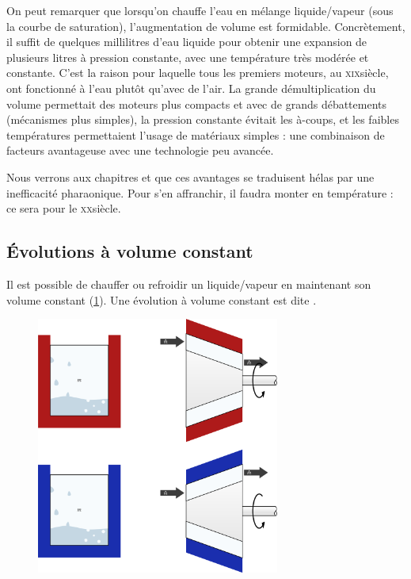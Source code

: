 		On peut remarquer que lorsqu’on chauffe l’eau en mélange liquide/vapeur (sous la courbe de saturation), l’augmentation de volume est formidable. Concrètement, il suffit de quelques millilitres d’eau liquide pour obtenir une expansion de plusieurs litres à pression constante, avec une température très modérée et constante. C’est la raison pour laquelle tous les premiers moteurs, au \textsc{xix}\ieme siècle, ont fonctionné à l’eau plutôt qu’avec de l’air. La grande démultiplication du volume permettait des moteurs plus compacts et avec de grands débattements (mécanismes plus simples), la pression constante évitait les à-coups, et les faibles températures permettaient l’usage de matériaux simples : une combinaison de facteurs avantageuse avec une technologie peu avancée.
		
		Nous verrons aux chapitres \coursseptplural et \coursneufplural que ces avantages se traduisent hélas par une inefficacité
pharaonique. Pour s’en affranchir, il faudra monter en température : ce sera pour le \textsc{xx}\ieme siècle.


	\subsection{Évolutions à volume constant}
	\label{ch_lv_isochores}

		Il est possible de chauffer ou refroidir un liquide/vapeur en maintenant son volume constant (\cref{fig_lv_isochore}). Une évolution à volume constant est dite .

		\begin{figure}
			\begin{center}
				\includegraphics[width=8cm]{images/lv_isochore.png}
			\end{center}
			\label{fig_lv_isochore}
		\end{figure}
		
